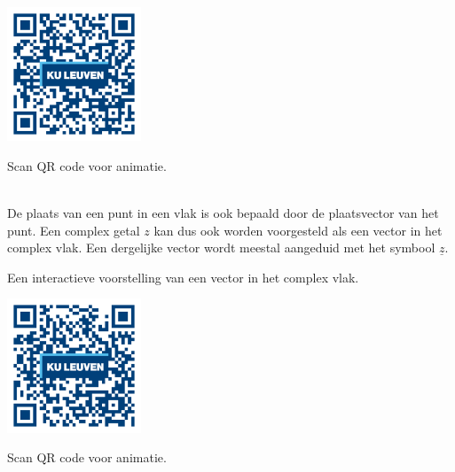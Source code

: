 \begin{minipage}{.25\linewidth}
	\raggedright
	\includegraphics[width=4cm]{3_gonio_complexe_getallen/inputs/QR_Code_ANIMATIE1_module3new}
\end{minipage}
\begin{minipage}{.7\linewidth}
	Scan QR code voor animatie.
\end{minipage}\\

De plaats van een punt in een vlak is ook bepaald door de plaatsvector van het punt. Een complex getal $z$ kan dus ook worden voorgesteld als een vector in het complex vlak. Een dergelijke vector wordt meestal aangeduid met het symbool $\underline{z}$.\\



\begin{figure}[H]
	\centering 
	 
\end{figure}




Een interactieve voorstelling van een vector in het complex vlak.\\

\begin{minipage}{.25\linewidth}
	\raggedright
	\includegraphics[width=4cm]{3_gonio_complexe_getallen/inputs/QR_Code_ANIMATIE2_module3new}
\end{minipage}
\begin{minipage}{.7\linewidth}
	Scan QR code voor animatie.
\end{minipage}  \\

